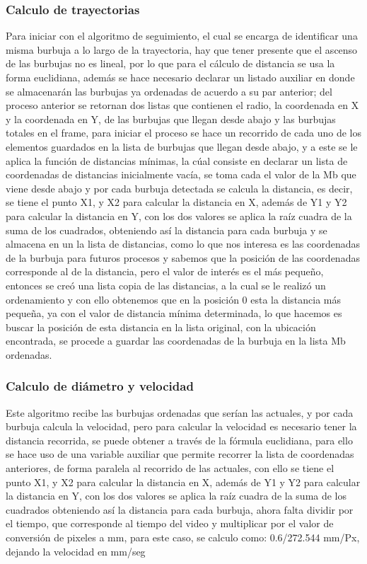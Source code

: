 \documentclass[12pt,twocolumn,a4paper]{article}
\begin{document}
\subsubsection{Calculo de trayectorias}

Para iniciar con el algoritmo de seguimiento, el cual se encarga de identificar una misma burbuja a lo largo de la trayectoria, hay que tener presente que el ascenso de las burbujas no es lineal, por lo que para el cálculo de distancia se usa la forma euclidiana, además se hace necesario declarar un listado auxiliar en donde se almacenarán las burbujas ya ordenadas de acuerdo a su par anterior; del proceso anterior se retornan dos listas que contienen el radio, la coordenada en X y la coordenada en Y, de las burbujas que llegan desde abajo y las burbujas totales en el frame,  para iniciar el proceso se hace un recorrido de cada uno de los elementos guardados en la lista de burbujas que llegan desde abajo, y a este se le aplica la función de distancias mínimas, la cúal consiste en declarar un lista de coordenadas de distancias inicialmente vacía, se toma cada el valor de la Mb que viene desde abajo y por cada burbuja detectada se calcula la distancia, es decir, se tiene el  punto X1, y X2 para calcular la distancia en X, además de Y1 y Y2 para calcular la distancia en Y, con los dos valores se aplica la raíz cuadra de la suma de los cuadrados,  obteniendo así la distancia para cada burbuja y se almacena en un la lista de distancias, como lo que nos interesa es las coordenadas de la burbuja para futuros procesos y sabemos que la posición de las coordenadas corresponde al de la distancia, pero el valor de interés es el más pequeño, entonces se creó una lista copia de las distancias, a la cual se le realizó un ordenamiento y con ello obtenemos que en la posición 0 esta la distancia más pequeña, ya con el valor de distancia mínima determinada, lo que hacemos es buscar la posición de esta distancia en la lista original, con la ubicación encontrada, se procede a guardar las coordenadas de la burbuja en la lista Mb ordenadas.


\subsubsection{Calculo de diámetro y velocidad }

Este algoritmo recibe las burbujas ordenadas que serían las actuales, y por cada burbuja calcula la velocidad, pero para calcular la velocidad es necesario tener la distancia recorrida, se puede obtener a través de la fórmula euclidiana, para ello se hace uso de una variable auxiliar que permite recorrer la lista de coordenadas anteriores, de forma paralela al recorrido de las actuales, con ello se tiene el  punto X1, y X2 para calcular la distancia en X, además de Y1 y Y2 para calcular la distancia en Y, con los dos valores se aplica la raíz cuadra de la suma de los cuadrados obteniendo así la distancia para cada burbuja, ahora falta dividir por el tiempo, que corresponde al tiempo del video y multiplicar por el valor de conversión de pixeles a mm, para este caso, se calculo como: 0.6/272.544 mm/Px, dejando la velocidad en mm/seg
\end{document}
